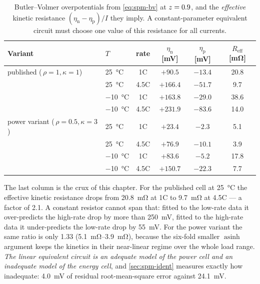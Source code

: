 \begin{table}[H]\centering
\caption{Butler--Volmer overpotentials from \eqref{eq:spm-bv} at $z=0.9$, and the
\emph{effective} kinetic resistance $(\eta_{\mathrm{n}}-\eta_{\mathrm{p}})/I$ they imply. A
constant-parameter equivalent circuit must choose one value of this resistance for all currents.}
\label{tab:spm-overpotential}
\begin{tabular}{llcccc}\toprule
Variant & $T$ & rate & $\eta_{\mathrm{n}}$ [\si{\milli\volt}] & $\eta_{\mathrm{p}}$ [\si{\milli\volt}] & $R_{\mathrm{eff}}$ [\si{\milli\ohm}] \\ \midrule
published (\,$\rho{=}1,\kappa{=}1$)
 & \SI{25}{\celsius} & 1C   & $+90.5$  & $-13.4$ & \num{20.8} \\
 & \SI{25}{\celsius} & 4.5C & $+166.4$ & $-51.7$ & \num{9.7} \\
 & \SI{-10}{\celsius} & 1C   & $+163.8$ & $-29.0$ & \num{38.6} \\
 & \SI{-10}{\celsius} & 4.5C & $+231.9$ & $-83.6$ & \num{14.0} \\[1mm]
power variant (\,$\rho{=}0.5,\kappa{=}3$)
 & \SI{25}{\celsius} & 1C   & $+23.4$  & $-2.3$  & \num{5.1} \\
 & \SI{25}{\celsius} & 4.5C & $+76.9$  & $-10.1$ & \num{3.9} \\
 & \SI{-10}{\celsius} & 1C   & $+83.6$  & $-5.2$  & \num{17.8} \\
 & \SI{-10}{\celsius} & 4.5C & $+150.7$ & $-22.3$ & \num{7.7} \\
\bottomrule\end{tabular}
\end{table}

The last column is the crux of this chapter. For the published cell at \SI{25}{\celsius} the
effective kinetic resistance drops from \SI{20.8}{\milli\ohm} at 1C to \SI{9.7}{\milli\ohm} at
4.5C --- a factor of \num{2.1}. A constant resistor cannot span that: fitted to the low-rate data
it over-predicts the high-rate drop by more than \SI{250}{\milli\volt}, fitted to the high-rate
data it under-predicts the low-rate drop by \SI{55}{\milli\volt}. For the power variant the same
ratio is only \num{1.33} (\SIrange{5.1}{3.9}{\milli\ohm}), because the six-fold smaller
$\operatorname{asinh}$ argument keeps the kinetics in their near-linear regime over the whole
load range. \emph{The linear equivalent circuit is an adequate model of the power cell and an
inadequate model of the energy cell}, and \cref{sec:spm-ident} measures exactly how inadequate:
\SI{4.0}{\milli\volt} of residual root-mean-square error against \SI{24.1}{\milli\volt}.

